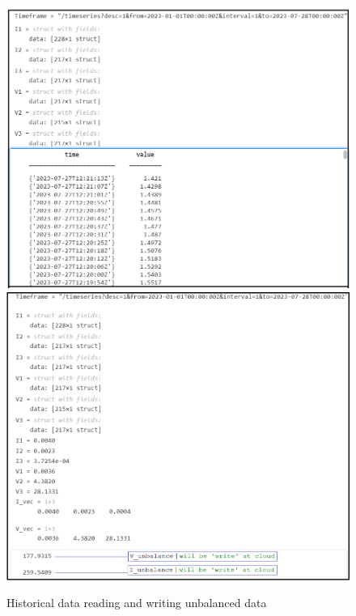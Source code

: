\begin{figure}[htbp]
\centering
\includegraphics[scale=0.450]{images/HistoricData.PNG} \includegraphics[scale=0.435]{images/UnbalancedWrite.PNG}
\caption{Historical data reading and writing unbalanced data}
\label{fig:x Historical}
\end{figure}
